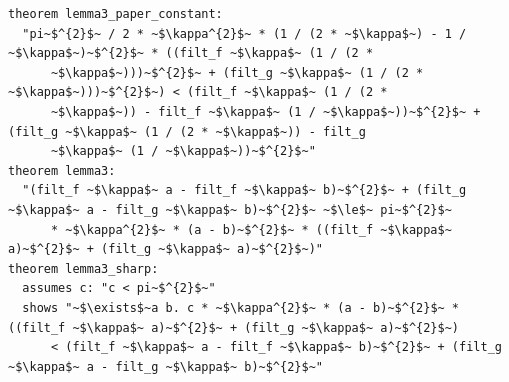 \begin{lstlisting}[float=tp,caption={Lemma~3 of the HHL paper: the counterexample to the paper's constant, the corrected constant, and its sharpness (for fixed \isa{$\kappa$ > 0}; \isa{filt\_f} and \isa{filt\_g} are the filter functions)},label={lst:lemma3}]
theorem lemma3_paper_constant:
  "pi~$^{2}$~ / 2 * ~$\kappa^{2}$~ * (1 / (2 * ~$\kappa$~) - 1 / ~$\kappa$~)~$^{2}$~ * ((filt_f ~$\kappa$~ (1 / (2 *
      ~$\kappa$~)))~$^{2}$~ + (filt_g ~$\kappa$~ (1 / (2 * ~$\kappa$~)))~$^{2}$~) < (filt_f ~$\kappa$~ (1 / (2 *
      ~$\kappa$~)) - filt_f ~$\kappa$~ (1 / ~$\kappa$~))~$^{2}$~ + (filt_g ~$\kappa$~ (1 / (2 * ~$\kappa$~)) - filt_g
      ~$\kappa$~ (1 / ~$\kappa$~))~$^{2}$~"
theorem lemma3:
  "(filt_f ~$\kappa$~ a - filt_f ~$\kappa$~ b)~$^{2}$~ + (filt_g ~$\kappa$~ a - filt_g ~$\kappa$~ b)~$^{2}$~ ~$\le$~ pi~$^{2}$~
      * ~$\kappa^{2}$~ * (a - b)~$^{2}$~ * ((filt_f ~$\kappa$~ a)~$^{2}$~ + (filt_g ~$\kappa$~ a)~$^{2}$~)"
theorem lemma3_sharp:
  assumes c: "c < pi~$^{2}$~"
  shows "~$\exists$~a b. c * ~$\kappa^{2}$~ * (a - b)~$^{2}$~ * ((filt_f ~$\kappa$~ a)~$^{2}$~ + (filt_g ~$\kappa$~ a)~$^{2}$~)
      < (filt_f ~$\kappa$~ a - filt_f ~$\kappa$~ b)~$^{2}$~ + (filt_g ~$\kappa$~ a - filt_g ~$\kappa$~ b)~$^{2}$~"
\end{lstlisting}

